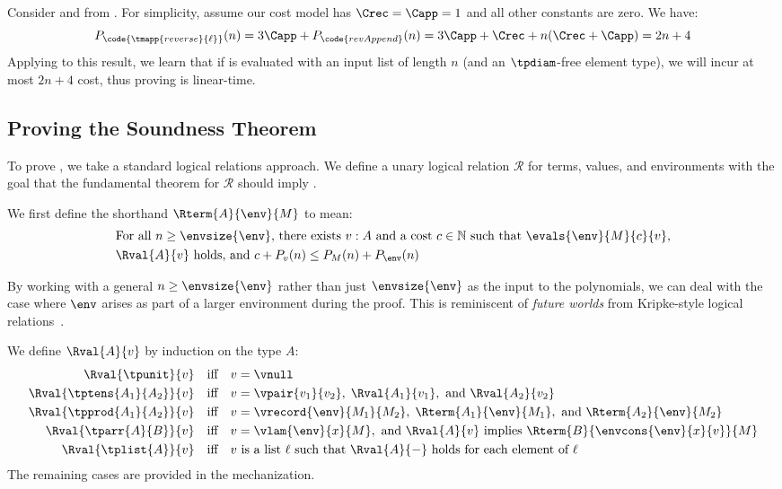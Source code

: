 \begin{example}
Consider  and  from . For simplicity, assume our cost model has $\Crec = \Capp = 1$ and all other constants are zero. We have:
\[ P_\code{\tmapp{reverse}{\ell}}(n) = 3\Capp + P_\code{revAppend}(n) = 3\Capp + \Crec + n(\Crec + \Capp) = 2n + 4 \]
Applying  to this result, we learn that if  is evaluated with an input list of length $n$ (and an $\tpdiam$-free element type), we will incur at most $2n + 4$ cost, thus proving  is linear-time.
\end{example}



\subsection{Proving the Soundness Theorem}
\label{sec:proving-general-soundness}

To prove , we take a standard logical relations approach. We define a unary logical relation $\mathcal R$ for terms, values, and environments with the goal that the fundamental theorem for $\mathcal R$ should imply .

\begin{definition}
We first define the shorthand $\Rterm{A}{\env}{M}$ to mean:
\begin{align*}
&\text{For all $n \ge \envsize{\env}$, there exists $v : A$ and a cost $c \in \mathbb N$ such that $\evals{\env}{M}{c}{v}$,} \\
&\text{$\Rval{A}{v}$ holds, and $c + P_v(n) \le P_M(n) + P_\env(n)$}
\end{align*}
\end{definition}
By working with a general $n \ge \envsize{\env}$ rather than just $\envsize{\env}$ as the input to the polynomials, we can deal with the case where $\env$ arises as part of a larger environment during the proof. This is reminiscent of \emph{future worlds} from Kripke-style logical relations~\cite{Mitchell1991}.

\begin{definition}
We define $\Rval{A}{v}$ by induction on the type $A$:
\begin{align*}
\Rval{\tpunit}{v} &\quad \text{iff} \quad v = \vnull \\
\Rval{\tptens{A_1}{A_2}}{v} &\quad \text{iff} \quad v = \vpair{v_1}{v_2}, \; \Rval{A_1}{v_1}, \text{ and } \Rval{A_2}{v_2} \\
\Rval{\tpprod{A_1}{A_2}}{v} &\quad \text{iff} \quad v = \vrecord{\env}{M_1}{M_2}, \; \Rterm{A_1}{\env}{M_1}, \text{ and } \Rterm{A_2}{\env}{M_2} \\
\Rval{\tparr{A}{B}}{v} &\quad \text{iff} \quad v = \vlam{\env}{x}{M}, \text{ and } \Rval{A}{v} \text{ implies } \Rterm{B}{\envcons{\env}{x}{v}}{M} \\
\Rval{\tplist{A}}{v} &\quad \text{iff} \quad \text{$v$ is a list $\ell$ such that } \Rval{A}{-} \text{ holds for each element of $\ell$ }
\end{align*}
The remaining cases are provided in the mechanization.
\end{definition}

